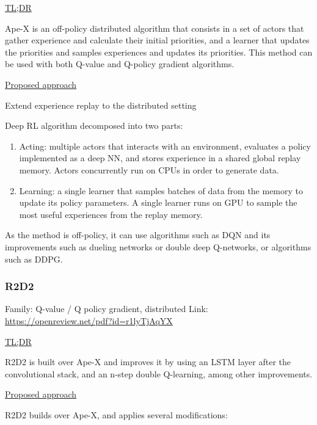 \documentclass[12pt, english]{article}
\begin{document}
\underline{TL;DR}

Ape-X \cite{} is an off-policy distributed algorithm that consists in a set of actors that gather experience and calculate their initial priorities, and a learner that updates the priorities and samples experiences and updates its priorities. This method can be used with both Q-value and Q-policy gradient algorithms.

\underline{Proposed approach}

Extend experience replay to the distributed setting

Deep RL algorithm decomposed into two parts:

\begin{enumerate}
  \item Acting: multiple actors that interacts with an environment, evaluates a policy implemented as a deep NN, and stores experience in a shared global replay memory. Actors concurrently run on CPUs in order to generate data.
  \item Learning: a single learner that samples batches of data from the memory to update its policy parameters. A single learner runs on GPU to sample the most useful experiences from the replay memory.
\end{enumerate}

As the method is off-policy, it can use algorithms such as DQN and its improvements such as dueling networks or double deep Q-networks, or algorithms such as DDPG.

\subsubsection{R2D2}
\label{R2D2}

Family: Q-value / Q policy gradient, distributed
Link: \url{https://openreview.net/pdf?id=r1lyTjAqYX}

\underline{TL;DR}

R2D2 is built over Ape-X and improves it by using an LSTM layer after the convolutional stack, and an n-step double Q-learning, among other improvements.

\underline{Proposed approach}

R2D2 builds over Ape-X, and applies several modifications:
\end{document}

